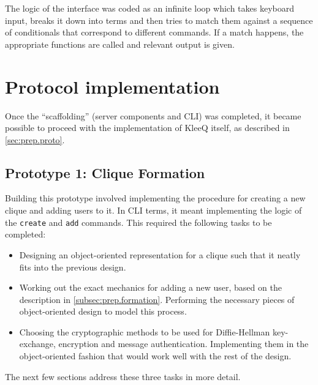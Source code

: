 \documentclass[a4paper, 12pt]{report}
\begin{document}
The logic of the interface was coded as an infinite loop which takes keyboard input, breaks it down into terms and then tries to match them against a sequence of conditionals that correspond to different commands. If a match happens, the appropriate functions are called and relevant output is given.


\section{Protocol implementation}
Once the ``scaffolding'' (server components and CLI) was completed, it became possible to proceed with the implementation of KleeQ itself, as described in \cref{sec:prep.proto}.


\subsection{Prototype 1: Clique Formation}
Building this prototype involved implementing the procedure for creating a new clique and adding users to it. In CLI terms, it meant implementing the logic of the \texttt{create} and \texttt{add} commands. This required the following tasks to be completed:

\begin{itemize}
    \item Designing an object-oriented representation for a clique such that it neatly fits into the previous design.
    \item Working out the exact mechanics for adding a new user, based on the description in \cref{subsec:prep.formation}. Performing the necessary pieces of object-oriented design to model this process.
    \item Choosing the cryptographic methods to be used for Diffie-Hellman key-exchange, encryption and message authentication. Implementing them in the object-oriented fashion that would work well with the rest of the design.
\end{itemize}

The next few sections address these three tasks in more detail.
\end{document}
